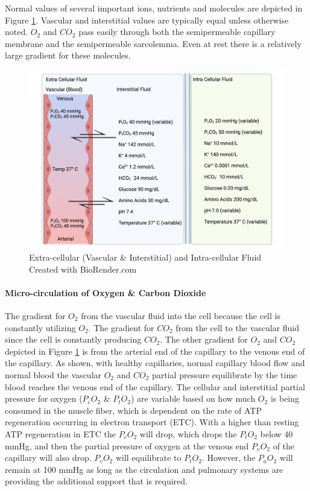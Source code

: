 Normal values of several important ions, nutrients and molecules are depicted in Figure \ref{fig:ecf}. Vascular and interstitial values are typically equal unless otherwise noted. $O_2$ and $CO_2$ pass easily through both the semipermeable capillary membrane and the semipermeable sarcolemma. Even at rest there is a relatively large gradient for these molecules. 

\begin{figure}[!h]
    \centering
    \includegraphics[width=1\linewidth]{./figure/ecf.png}
    \caption{Extra-cellular (Vascular \& Interstitial) and Intra-cellular Fluid \footnotesize{Created with BioRender.com}}
    \label{fig:ecf}
\end{figure}

\paragraph{Micro-circulation of Oxygen \& Carbon Dioxide}

The gradient for $O_2$ from the vascular fluid into the cell because the cell is constantly utilizing $O_2$. The gradient for $CO_2$ from the cell to the vascular fluid since the cell is constantly producing $CO_2$. The other gradient for $O_2$ and $CO_2$ depicted in Figure \ref{fig:ecf} is from the arterial end of the capillary to the venous end of the capillary. As shown, with healthy capillaries, normal capillary blood flow and normal blood the vascular $O_2$ and $CO_2$ partial pressure equilibrate by the time blood reaches the venous end of the capillary. The cellular and interstitial partial pressure for oxygen ($P_c O_2$ \& $P_t O_2$) are variable based on how much $O_2$ is being consumed in the muscle fiber, which is dependent on the rate of ATP regeneration occurring in electron transport (ETC). With a higher than resting ATP regeneration in ETC the $P_c O_2$ will drop, which drops the $P_t O_2$ below 40 mmHg, and then the partial pressure of oxygen at the venous end $P_v O_2$ of the capillary will also drop. $P_v O_2$ will equilibrate to $P_t O_2$. However, the $P_a O_2$ will remain at 100 mmHg as long as the circulation and pulmonary systems are providing the additional support that is required.

